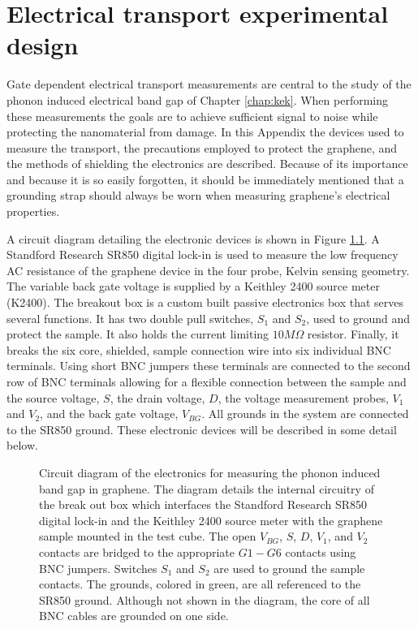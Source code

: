 \chapter{Electrical transport experimental design \label{chap:elec}}
Gate dependent electrical transport measurements are central to the study of the phonon induced electrical band gap of Chapter \ref{chap:kek}.
When performing these measurements the goals are to achieve sufficient signal to noise while protecting the nanomaterial from damage.
In this Appendix the devices used to measure the transport, the precautions employed to protect the graphene, and the methods of shielding the electronics are described.
Because of its importance and because it is so easily forgotten, it should be immediately mentioned that a grounding strap should always be worn when measuring graphene's electrical properties.

A circuit diagram detailing the electronic devices is shown in Figure \ref{fig:elec:wires}.
A Standford Research SR850 digital lock-in is used to measure the low frequency AC resistance of the graphene device in the four probe, Kelvin sensing geometry.
The variable back gate voltage is supplied by a Keithley 2400 source meter (K2400).
The breakout box is a custom built passive electronics box that serves several functions.
It has two double pull switches, $S_1$ and $S_2$, used to ground and protect the sample.
It also holds the current limiting $10 M \Omega$ resistor.
Finally, it breaks the six core, shielded, sample connection wire into six individual BNC terminals.
Using short BNC jumpers these terminals are connected to the second row of BNC terminals allowing for a flexible connection between the sample and the source voltage, $S$, the drain voltage, $D$, the voltage measurement probes, $V_1$ and $V_2$, and the back gate voltage, $V_{BG}$.
All grounds in the system are connected to the SR850 ground.
These electronic devices will be described in some detail below.

\begin{figure}
	\begin{center}
	
	\end{center}
	\caption[Circuit diagram for graphene electrical transport measurements]{\label{fig:elec:wires}
		Circuit diagram of the electronics for measuring the phonon induced band gap in graphene.
		The diagram details the internal circuitry of the break out box which interfaces the Standford Research SR850 digital lock-in and the Keithley 2400 source meter with the graphene sample mounted in the test cube.
		The open $V_{BG}$, $S$, $D$, $V_1$, and $V_2$ contacts are bridged to the appropriate $G1-G6$ contacts using BNC jumpers.
		Switches $S_1$ and $S_2$ are used to ground the sample contacts.
		The grounds, colored in green, are all referenced to the SR850 ground.
		Although not shown in the diagram, the core of all BNC cables are grounded on one side.
	}
\end{figure}

